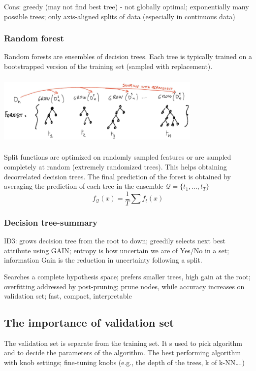 \documentclass{article}
\begin{document}
Cons: greedy (may not find best tree) - not globally optimal; exponentially many possible trees; only axis-aligned splits of data (especially in continuous data)


\subsubsection*{Random forest}
Random forests are ensembles of decision trees. Each tree is typically trained on a bootstrapped version of the training set (sampled with replacement).

\centering\includegraphics[width=10cm, height=3.5cm]{img/rnd_forest.png}	

\raggedright Split functions are optimized on randomly sampled features or are sampled completely at random (extremely randomized trees). This helps obtaining decorrelated decision trees. The final prediction of the forest is obtained by averaging the prediction of each tree in the ensemble \(\mathcal{Q} = \{t_1, ..., t_T\}\)
\[f_\mathcal{Q}(x) = \dfrac{1}{T} \sum f_t(x)\]


\subsubsection*{Decision tree-summary}
ID3: grows decision tree from the root to down; greedily selects next best attribute using GAIN; entropy is how uncertain we are of Yes/No in a set; information Gain is the reduction in uncertainty following a split. 

Searches a complete hypothesis space; prefers smaller trees, high gain at the root; overfitting addressed by post-pruning; prune nodes, while accuracy increases on validation set; fast, compact, interpretable




\subsection*{The importance of validation set}

The validation set is separate from the training set. It s used to pick algorithm and to decide the parameters of the algorithm. The best performing algorithm with knob settings; fine-tuning knobs (e.g., the depth of the trees, k of k-NN….)
\end{document}
